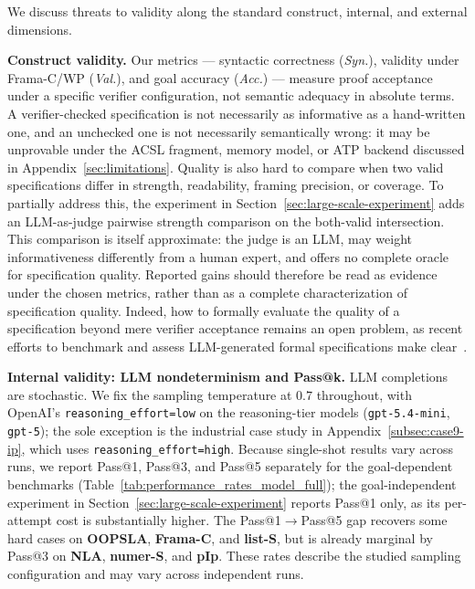 We discuss threats to validity along the standard construct, internal, and
external dimensions.

\smallskip
\noindent\textbf{Construct validity.}
Our metrics --- syntactic correctness (\emph{Syn.}), validity under Frama-C/WP
(\emph{Val.}), and goal accuracy (\emph{Acc.}) --- measure proof acceptance
under a specific verifier configuration, not semantic adequacy in absolute
terms. A verifier-checked specification is not necessarily as informative as a
hand-written one, and an unchecked one is not necessarily semantically wrong: it
may be unprovable under the ACSL fragment, memory model, or ATP backend
discussed in Appendix~\ref{sec:limitations}. Quality is also hard to compare when
two valid specifications differ in strength, readability, framing precision, or
coverage. To partially address this, the experiment in
Section~\ref{sec:large-scale-experiment} adds an LLM-as-judge pairwise strength
comparison on the both-valid intersection. This comparison is itself
approximate: the judge is an LLM, may weight informativeness differently from a
human expert, and offers no complete oracle for specification quality. Reported
gains should therefore be read as evidence under the chosen metrics, rather than
as a complete characterization of specification quality. Indeed, how to
formally evaluate the quality of a specification beyond mere verifier
acceptance remains an open problem, as recent efforts to benchmark and assess
LLM-generated formal specifications make
clear~\cite{yang2026how,thakur2025clever}.

\smallskip
\noindent\textbf{Internal validity: LLM nondeterminism and Pass@k.}
LLM completions are stochastic. We fix the sampling temperature at $0.7$
throughout, with OpenAI's \texttt{reasoning\_effort=low} on the reasoning-tier
models (\texttt{gpt-5.4-mini}, \texttt{gpt-5}); the sole exception is the
industrial case study in {Appendix}~\ref{subsec:case9-ip}, which uses
\texttt{reasoning\_effort=high}.
Because single-shot results vary across runs, we report Pass@1,
Pass@3, and Pass@5 separately for the goal-dependent benchmarks
(Table~\ref{tab:performance_rates_model_full}); the goal-independent
experiment in Section~\ref{sec:large-scale-experiment} reports Pass@1 only, as its
per-attempt cost is substantially higher. The Pass@1$\to$Pass@5 gap recovers
some hard cases on \textbf{OOPSLA}, \textbf{Frama-C}, and \textbf{list-S}, but is
already marginal by Pass@3 on \textbf{NLA}, \textbf{numer-S}, and \textbf{pIp}.
These rates describe the studied sampling configuration and may vary across independent runs.

